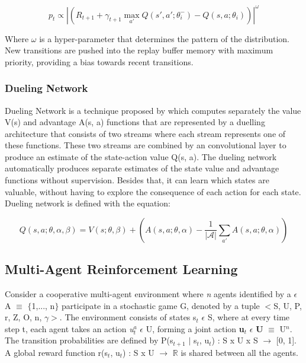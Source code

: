 \documentclass{llncs}
\begin{document}
\begin{equation}
p_{t} \propto \left|\left(R_{t+1} + \gamma_{t+1} \max_{a'}Q\left(s',a';\theta_{i}^{-}\right) - Q\left(s,a;\theta_{i}\right)\right)\right|^{\omega}
\end{equation}

Where $\omega$ is a hyper-parameter that determines the pattern of the distribution. New transitions are pushed into the replay buffer memory with maximum priority, providing a bias towards recent transitions.

\subsubsection{Dueling Network}\label{duelingNet}

Dueling Network is a technique proposed by \cite{Wang2016} which computes separately the value V(s) and advantage A(s, a) functions that are represented by a duelling architecture that consists of two streams where each stream represents one of these functions. These two streams are combined by an convolutional layer to produce an estimate of the state-action value Q(s, a). The dueling network automatically produces separate estimates of the state value and advantage functions without supervision. Besides that, it can learn which states are valuable, without having to explore the consequence of each action for each state. Dueling network is defined with the equation:

\begin{equation} \label{eq:dueling eq}
Q(s,a;\theta,\alpha,\beta) = V(s;\theta,\beta) + \left( A\left(s,a;\theta,\alpha \right) - \frac{1}{|\mathcal{A}|} \displaystyle\sum_{a'} A\left(s,a;\theta,\alpha \right) \right) 
\end{equation}
	
\subsection{Multi-Agent Reinforcement Learning} \label{sec:MARL}

Consider a cooperative multi-agent environment where \textit{n} agents identified by a $\epsilon$ A $\equiv$ $\{$1,..., n$\}$ participate in a stochastic game G, denoted by a tuple $<$S, U, P, r, Z, O, n, $\gamma>$. The environment consists of states s$_{t}$ $\epsilon$ S, where at every time step t, each agent takes an action \textit{u$^{a}_{t}$} $\epsilon$ U, forming a joint action \textbf{u$_{t}$} $\epsilon$ \textbf{U} $\equiv$ U$^{n}$.
The transition probabilities are defined by P(s$_{t+1}$ $|$ s$_{t}$, u$_{t}$) : S x U x S $\rightarrow$ [0, 1]. A global reward function r(s$_{t}$, u$_{t}$) : S x U $\rightarrow$ $\mathbb{R}$ is shared between all the agents.
\end{document}
